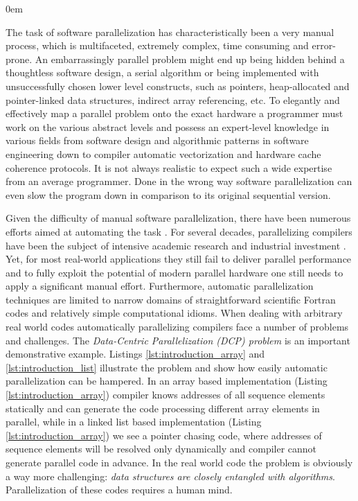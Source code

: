 \begin{description}[style=unboxed,leftmargin=0cm]
\itemsep0em
\item[\textit{Manual parallelization challenges}] The task of software parallelization has characteristically been a very manual process, which is multifaceted, extremely complex, time consuming and error-prone. An embarrassingly parallel problem might end up being hidden behind a thoughtless software design, a serial algorithm or being implemented with unsuccessfully chosen lower level constructs, such as pointers, heap-allocated and pointer-linked data structures, indirect array referencing, etc. To elegantly and effectively map a parallel problem onto the exact hardware a programmer must work on the various abstract levels and possess an expert-level knowledge in various fields from software design and algorithmic patterns in software engineering down to compiler automatic vectorization and hardware cache coherence protocols. It is not always realistic to expect such a wide expertise from an average programmer. Done in the wrong way software parallelization can even slow the program down in comparison to its original sequential version.
\item[\textit{Automatic parallelization limitations}] Given the difficulty of manual software parallelization, there have been numerous efforts aimed at automating the task \cite{Bacon:1994:CTH:197405.197406}. For several decades, parallelizing compilers have been the subject of intensive academic research \cite{6813266} and industrial investment \cite{icc-compiler}. Yet, for most real-world applications they still fail to deliver parallel performance and to fully exploit the potential of modern parallel hardware one still needs to apply a significant manual effort. Furthermore, automatic parallelization techniques are limited to narrow domains of straightforward scientific Fortran codes and relatively simple computational idioms. When dealing with arbitrary real world codes automatically parallelizing compilers face a number of problems and challenges. The \textit{Data-Centric Parallelization (DCP) problem} is an important demonstrative example. Listings \ref{lst:introduction_array} and \ref{lst:introduction_list} illustrate the problem and show how easily automatic parallelization can be hampered. In an array based implementation (Listing \ref{lst:introduction_array}) compiler knows addresses of all sequence elements statically and can generate the code processing different array elements in parallel, while in a linked list based implementation (Listing \ref{lst:introduction_array}) we see a pointer chasing code, where addresses of sequence elements will be resolved only dynamically and compiler cannot generate parallel code in advance. In the real world code the problem is obviously a way more challenging: \textit{data structures are closely entangled with algorithms}. Parallelization of these codes requires a human mind.\newline\null

\end{description}
